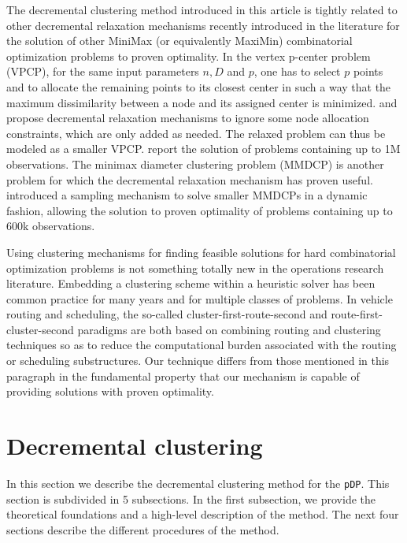 \documentclass[a4paper,10pt]{article}
\newcommand{\pDP}{\texttt{pDP}}
\begin{document}
The decremental clustering method introduced in this article is tightly related to other decremental relaxation mechanisms recently introduced in the literature for the solution of other MiniMax (or equivalently MaxiMin) combinatorial optimization problems to proven optimality. In the vertex p-center problem (VPCP), for the same input parameters $n, D$ and $p$, one has to select $p$ points and to allocate the remaining points to its closest center in such a way that the maximum dissimilarity between a node and its assigned center is minimized. \citet{Chen2009New} and \citet{Contardo2019scalable} propose decremental relaxation mechanisms to ignore some node allocation constraints, which are only added as needed. The relaxed problem can thus be modeled as a smaller VPCP. \citet{Contardo2019scalable} report the solution of problems containing up to 1M observations. The minimax diameter clustering problem (MMDCP) is another problem for which the decremental relaxation mechanism has proven useful. \citet{Aloise2018sampling} introduced a sampling mechanism to solve smaller MMDCPs in a dynamic fashion, allowing the solution to proven optimality of problems containing up to 600k observations.

Using clustering mechanisms for finding feasible solutions for hard combinatorial optimization problems is not something totally new in the operations research literature. Embedding a clustering scheme within a heuristic solver has been common practice for many years and for multiple classes of problems. In vehicle routing and scheduling, the so-called cluster-first-route-second \citep{Solomon1987algorithms, Braysy2005Vehicle} and route-first-cluster-second \citep{Beasley1983route, Prins2014Order} paradigms are both based on combining routing and clustering techniques so as to reduce the computational burden associated with the routing or scheduling substructures. Our technique differs from those mentioned in this paragraph in the fundamental property that our mechanism is capable of providing solutions with proven optimality.

\section{Decremental clustering\label{section:decrclust}}

In this section we describe the decremental clustering method for the \pDP{}. This section is subdivided in 5 subsections. In the first subsection, we provide the theoretical foundations and a high-level description of the method. The next four sections describe the different procedures of the method.
\end{document}
